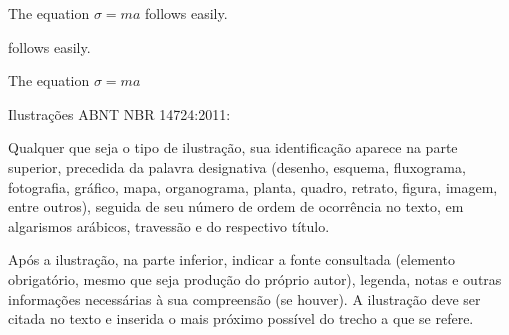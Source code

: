 The equation $\sigma = m a$%
%
follows easily.

follows easily.



The equation $\sigma = m a$%
%




Ilustrações ABNT NBR 14724:2011:

Qualquer que seja o tipo de ilustração, sua identificação aparece na parte superior, precedida da palavra designativa (desenho, esquema, fluxograma, fotografia, gráfico, mapa, organograma, planta, quadro, retrato, figura, imagem, entre outros), seguida de seu número de ordem de ocorrência no texto, em algarismos arábicos, travessão e do respectivo título. 

Após a ilustração, na parte inferior, indicar a fonte consultada (elemento obrigatório, mesmo que seja produção do próprio autor), legenda, notas e outras informações necessárias à sua compreensão (se houver). A ilustração deve ser citada no texto e inserida o mais próximo possível do trecho a que se refere.